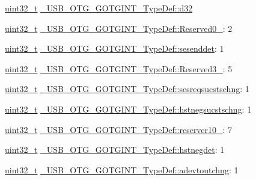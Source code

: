 \begin{DoxyCompactItemize}
\begin{tabbing}
\end{tabbing}\item 
\hyperlink{stdint_8h_a435d1572bf3f880d55459d9805097f62}{uint32\-\_\-t} \hyperlink{group___u_s_b___o_t_g___d_r_i_v_e_r_gaccd55daf5f4a8c68ad1a4d257c19538c}{\-\_\-\-U\-S\-B\-\_\-\-O\-T\-G\-\_\-\-G\-O\-T\-G\-I\-N\-T\-\_\-\-Type\-Def\-::d32}
\item 
\hyperlink{stdint_8h_a435d1572bf3f880d55459d9805097f62}{uint32\-\_\-t} \hyperlink{group___u_s_b___o_t_g___d_r_i_v_e_r_gaa27cf9c3b6dabb69c2e2c1bf48655e7d}{\-\_\-\-U\-S\-B\-\_\-\-O\-T\-G\-\_\-\-G\-O\-T\-G\-I\-N\-T\-\_\-\-Type\-Def\-::\-Reserved0\-\_}\-: 2
\item 
\hyperlink{stdint_8h_a435d1572bf3f880d55459d9805097f62}{uint32\-\_\-t} \hyperlink{group___u_s_b___o_t_g___d_r_i_v_e_r_gac879190d50dfae7a98b21236d524b7da}{\-\_\-\-U\-S\-B\-\_\-\-O\-T\-G\-\_\-\-G\-O\-T\-G\-I\-N\-T\-\_\-\-Type\-Def\-::sesenddet}\-: 1
\item 
\hyperlink{stdint_8h_a435d1572bf3f880d55459d9805097f62}{uint32\-\_\-t} \hyperlink{group___u_s_b___o_t_g___d_r_i_v_e_r_gad5f21fa6443d761dd45cf6056dbbadc3}{\-\_\-\-U\-S\-B\-\_\-\-O\-T\-G\-\_\-\-G\-O\-T\-G\-I\-N\-T\-\_\-\-Type\-Def\-::\-Reserved3\-\_}\-: 5
\item 
\hyperlink{stdint_8h_a435d1572bf3f880d55459d9805097f62}{uint32\-\_\-t} \hyperlink{group___u_s_b___o_t_g___d_r_i_v_e_r_gae1b7683211f53c2ae86a79983383a49f}{\-\_\-\-U\-S\-B\-\_\-\-O\-T\-G\-\_\-\-G\-O\-T\-G\-I\-N\-T\-\_\-\-Type\-Def\-::sesreqsucstschng}\-: 1
\item 
\hyperlink{stdint_8h_a435d1572bf3f880d55459d9805097f62}{uint32\-\_\-t} \hyperlink{group___u_s_b___o_t_g___d_r_i_v_e_r_ga4910cdca8d45c257197d1eafda55ddbb}{\-\_\-\-U\-S\-B\-\_\-\-O\-T\-G\-\_\-\-G\-O\-T\-G\-I\-N\-T\-\_\-\-Type\-Def\-::hstnegsucstschng}\-: 1
\item 
\hyperlink{stdint_8h_a435d1572bf3f880d55459d9805097f62}{uint32\-\_\-t} \hyperlink{group___u_s_b___o_t_g___d_r_i_v_e_r_gae428c081adf043cb149c9d1dd45c1a99}{\-\_\-\-U\-S\-B\-\_\-\-O\-T\-G\-\_\-\-G\-O\-T\-G\-I\-N\-T\-\_\-\-Type\-Def\-::reserver10\-\_}\-: 7
\item 
\hyperlink{stdint_8h_a435d1572bf3f880d55459d9805097f62}{uint32\-\_\-t} \hyperlink{group___u_s_b___o_t_g___d_r_i_v_e_r_ga31938c28140ff521cead9f6178569b80}{\-\_\-\-U\-S\-B\-\_\-\-O\-T\-G\-\_\-\-G\-O\-T\-G\-I\-N\-T\-\_\-\-Type\-Def\-::hstnegdet}\-: 1
\item 
\hyperlink{stdint_8h_a435d1572bf3f880d55459d9805097f62}{uint32\-\_\-t} \hyperlink{group___u_s_b___o_t_g___d_r_i_v_e_r_ga39bad2c1d3b0fda34c485f0f40e06619}{\-\_\-\-U\-S\-B\-\_\-\-O\-T\-G\-\_\-\-G\-O\-T\-G\-I\-N\-T\-\_\-\-Type\-Def\-::adevtoutchng}\-: 1

\end{DoxyCompactItemize}
